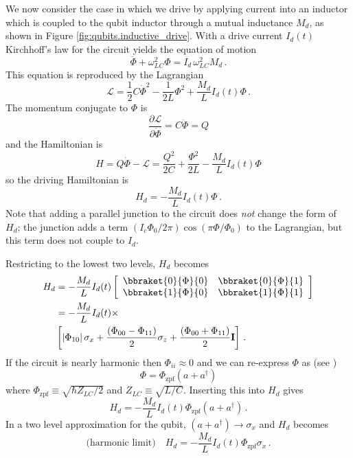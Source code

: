 We now consider the case in which we drive by applying current into an inductor which is coupled to the qubit inductor through a mutual inductance $M_d$, as shown in Figure \ref{fig:qubits.inductive_drive}.
With a drive current $I_d(t)$ Kirchhoff's law for the circuit yields the equation of motion
\begin{equation}
  \ddot{\Phi} + \omega_{LC}^2 \Phi = I_d \, \omega_{LC}^2 M_d \, .
\end{equation}
This equation is reproduced by the Lagrangian
\begin{equation}
  \mathcal{L} = \frac{1}{2}C \dot{\Phi}^2 - \frac{1}{2L} \Phi^2 + \frac{M_d}{L}I_d(t) \Phi \, .
\end{equation}
The momentum conjugate to $\Phi$ is
\begin{equation}
  \frac{\partial \mathcal{L}}{\partial \dot{\Phi}} = C \dot{\Phi} = Q
\end{equation}
and the Hamiltonian is
\begin{equation}
  H
  = Q \dot{\Phi} - \mathcal{L}
  = \frac{Q^2}{2C} + \frac{\Phi^2}{2L} - \frac{M_d}{L} I_d(t) \Phi
\end{equation}
so the driving Hamiltonian is
\begin{equation}
  H_d = - \frac{M_d}{L}I_d(t) \Phi \, .
\end{equation}
Note that adding a parallel junction to the circuit does \emph{not} change the form of $H_d$; the junction adds a term $(I_c \Phi_0 / 2\pi)\cos(\pi \Phi / \Phi_0)$ to the Lagrangian, but this term does not couple to $I_d$.

Restricting to the lowest two levels, $H_d$ becomes
\begin{align}
  H_d
  &= - \frac{M_d}{L} I_d(t)
  \left[ \begin{array}{cc}
    \bbraket{0}{\Phi}{0} & \bbraket{0}{\Phi}{1} \\
    \bbraket{1}{\Phi}{0} & \bbraket{1}{\Phi}{1} 
  \end{array} \right] \\
  &= - \frac{M_d}{L} I_d(t) \times \nonumber \\
  &\left[
    \left| \Phi_{10} \right| \sigma_x
    + \frac{(\Phi_{00} - \Phi_{11})}{2} \sigma_z
    + \frac{(\Phi_{00} + \Phi_{11})}{2} \mathbf{I}
  \right] \, .
\end{align}
If the circuit is nearly harmonic then $\Phi_{ii} \approx 0$ and we can re-express $\Phi$ as (see \citeinternaltype {})
\begin{equation}
  \Phi = \Phi_{\text{zpf}} \left( a + a^\dagger \right)
\end{equation}
where $\Phi_{\text{zpf}} \equiv \sqrt{\hbar Z_{LC} / 2}$ and $Z_{LC} \equiv \sqrt{L/C}$.
Inserting this into $H_d$ gives
\begin{equation}
  H_d = -\frac{M_d}{L} I_d(t) \Phi_{\text{zpf}} (a + a^\dagger) \, .
\end{equation}
In a two level approximation for the qubit, $(a + a^\dagger)\rightarrow \sigma_x$ and $H_d$ becomes
\begin{equation}
  \text{(harmonic limit)} \quad H_d = - \frac{M_d}{L} I_d(t) \Phi_{\text{zpf}} \sigma_x \, .
\end{equation}
